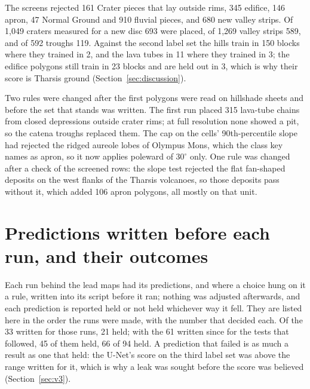 \documentclass[twocolumn]{aastex701}
\begin{document}
The screens rejected 161 Crater pieces that lay outside rims, 345 edifice, 146 apron, 47 Normal Ground and 910 fluvial
pieces, and 680 new valley strips. Of 1,049 craters measured for a new disc 693 were placed, of 1,269 valley strips
589, and of 592 troughs 119. Against the second label set the hills train in 150 blocks where they trained in 2, and
the lava tubes in 11 where they trained in 3; the edifice polygons still train in 23 blocks and are held out in 3,
which is why their score is Tharsis ground (Section~\ref{sec:discussion}). %

Two rules were changed after the first polygons were read on hillshade sheets and before the set that stands was
written. The first run placed 315 lava-tube chains from closed depressions outside crater rims; at full resolution
none showed a pit, so the catena troughs replaced them. The cap on the cells' 90th-percentile slope had rejected the
ridged aureole lobes of Olympus Mons, which the class key names as apron, so it now applies poleward of $30^{\circ}$
only. One rule was changed after a check of the screened rows: the slope test rejected the flat fan-shaped deposits on the west
flanks of the Tharsis volcanoes, so those deposits pass without it, which added 106 apron polygons, all mostly on that unit.

\section{Predictions written before each run, and their outcomes} \label{app:predictions}

Each run behind the lead maps had its predictions, and where a choice hung on it a rule, written into its script
before it ran; nothing was adjusted afterwards, and each prediction is reported held or not held whichever way it
fell. They are listed here in the order the runs were made, with the number that decided each. Of the 33 written for those runs, 21
held; with the 61 written since for the tests that followed, 45 of them held, 66 of 94 held. A prediction that failed is as much a result as one that held: the U-Net's score on the third label set was
above the range written for it, which is why a leak was sought before the score was believed
(Section~\ref{sec:v3}). %
\end{document}
